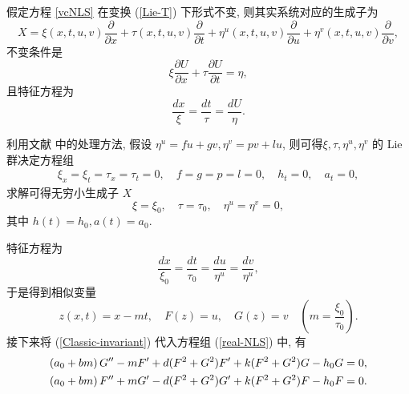 假定方程 \eqref{vcNLS} 在变换 (\ref{Lie-T}) 下形式不变, 则其实系统对应的生成子为
\begin{equation}
X=\xi(x,t,u,v)\frac{\partial}{\partial x}+\tau(x,t,u,v)\frac{\partial}{\partial t}+\eta^u(x,t,u,v)\frac{\partial}{\partial u}+\eta^v(x,t,u,v)\frac{\partial}{\partial v},
\end{equation}
不变条件是
\begin{equation*}
\xi \frac{\partial U}{\partial x}+\tau \frac{\partial U}{\partial t}=\eta,
\end{equation*}
且特征方程为
\begin{equation*}
\frac{d x}{\xi}=\frac{d t}{\tau}=\frac{d U}{\eta}.
\end{equation*}



利用文献 \cite{Bluman2002} 中的处理方法, 假设 $\eta^u=fu+gv,\eta^v=pv+lu$, 则可得$\xi, \tau, \eta^u, \eta^v$ 的 Lie 群决定方程组
\begin{align*}
\xi_x=\xi_t=\tau_x=\tau_t=0,\quad f=g=p=l=0,\quad h_t=0,\quad a_t=0,
\end{align*}
求解可得无穷小生成子 $X$
$$\xi=\xi_0,\quad \tau=\tau_0,\quad \eta^u=\eta^v=0,$$
其中 $h(t)=h_0,a(t)=a_0$.

特征方程为
\begin{equation*}
\frac{dx}{\xi_0}=\frac{dt}{\tau_0}=\frac{du}{\eta^u}=\frac{dv}{\eta^u},
\end{equation*}
于是得到相似变量
\begin{equation}\label{Classic-invariant}
z(x,t)=x-mt,\quad F(z)=u,\quad G(z)=v \quad(m=\frac{\xi_0}{\tau_0}).
\end{equation}
接下来将 (\ref{Classic-invariant}) 代入方程组 (\ref{real-NLS}) 中, 有
\begin{align}
(a_0+bm)\,G''-m F'+d(F^2+G^2)F'+k(F^2+G^2)G-h_0G=0,\notag\\
(a_0+bm)\,F''+m G'-d(F^2+G^2)G'+k(F^2+G^2)F-h_0F=0.
\end{align}


